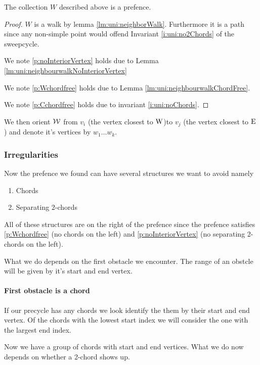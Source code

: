     \begin{lemma}
      \label{lm:uni:isPrefence}
    The collection $W$ described above is a prefence.
    \end{lemma}
    \begin{proof}
    $W$ is a walk by lemma \ref{lm:uni:neighborWalk}. Furthermore it is a path since any non-simple point would offend Invariant \ref{i:uni:no2Chords} of the sweepcycle.


    We note \ref{p:noInteriorVertex} holds due to Lemma \ref{lm:uni:neighbourwalkNoInteriorVertex}

    We note \ref{p:Wchordfree} holds due to Lemma \ref{lm:uni:neighbourwalkChordFree}.

    We note \ref{p:Cchordfree} holds due to invariant \ref{i:uni:noChords}.
    \end{proof}

    We then orient $\mathcal{W}$ from $v_i$ (the vertex closest to $\mathrm{W}$)to $v_j$ (the vertex closest to $\mathrm{E}$) and denote it's vertices by $w_1 \ldots w_k$.


    \subsubsection{Irregularities}
      Now the prefence we found can have several structures we want to avoid
      namely
      \begin{enumerate}
        \itemsep=-4pt
        \item Chords
        \item Separating 2-chords
      \end{enumerate}

      All of these structures are on the right of the prefence since the prefence satisfies \ref{p:Wchordfree} (no chords on the left) and \ref{p:noInteriorVertex} (no separating 2-chords on the left).

      What we do depends on the first obstacle we encounter. The range of an obstcle will be given by it's start  and end vertex.

      \paragraph{First obstacle is a chord}
      If our precycle has any chords we look identify the them by their start and end vertex. Of the chords with the lowest start index we will consider the one with the largest end index.

      Now we have a group of chords with start and end vertices. What we do now depends on whether a 2-chord shows up.

